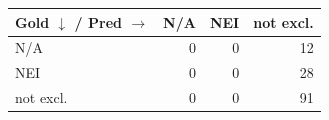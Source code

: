 \begin{tabular}{lrrr}
\toprule
Gold $\downarrow$ / Pred $\rightarrow$ & N/A & NEI & not excl. \\
\midrule
N/A & 0 & 0 & 12 \\
NEI & 0 & 0 & 28 \\
not excl. & 0 & 0 & 91 \\
\bottomrule
\end{tabular}
